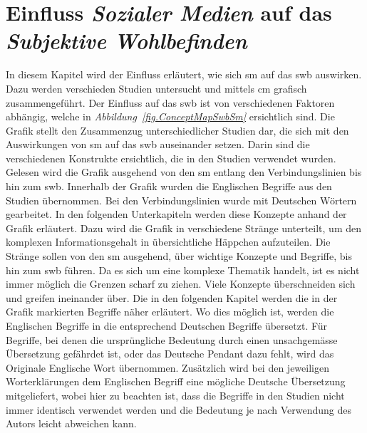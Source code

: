 %
%
\thispagestyle{empty}
\chapter{Einfluss \textit{Sozialer Medien} auf das \textit{Subjektive Wohlbefinden}}\label{chap.einfluss}
In diesem Kapitel wird der Einfluss erläutert, wie sich \gls{sm} auf das \gls{swb} auswirken. Dazu werden verschieden Studien untersucht und mittels \gls{cm} grafisch zusammengeführt. Der Einfluss auf das \gls{swb} ist von verschiedenen Faktoren abhängig, welche in \textit{Abbildung~\ref{fig.ConceptMapSwbSm}} ersichtlich sind.\newline
Die Grafik stellt den Zusammenzug unterschiedlicher Studien dar, die sich mit den Auswirkungen von \gls{sm} auf das \gls{swb} auseinander setzen. Darin sind die verschiedenen Konstrukte ersichtlich, die in den Studien verwendet wurden. Gelesen wird die Grafik ausgehend von den \gls{sm} entlang den Verbindungslinien bis hin zum \gls{swb}.\newline
Innerhalb der Grafik wurden die Englischen Begriffe aus den Studien übernommen. Bei den Verbindungslinien wurde mit Deutschen Wörtern gearbeitet.\newline
In den folgenden Unterkapiteln werden diese Konzepte anhand der Grafik erläutert. Dazu wird die Grafik in verschiedene Stränge unterteilt, um den komplexen Informationsgehalt in übersichtliche Häppchen aufzuteilen. Die Stränge sollen von den \gls{sm} ausgehend, über wichtige Konzepte und Begriffe, bis hin zum \gls{swb} führen. Da es sich um eine komplexe Thematik handelt, ist es nicht immer möglich die Grenzen scharf zu ziehen. Viele Konzepte überschneiden sich und greifen ineinander über.\newline
Die in den folgenden Kapitel werden die in der Grafik markierten Begriffe näher erläutert. Wo dies möglich ist, werden die Englischen Begriffe in die entsprechend Deutschen Begriffe übersetzt. Für Begriffe, bei denen die ursprüngliche Bedeutung durch einen unsachgemässe Übersetzung gefährdet ist, oder das Deutsche Pendant dazu fehlt, wird das Originale Englische Wort übernommen. Zusätzlich wird bei den jeweiligen Worterklärungen dem Englischen Begriff eine mögliche Deutsche Übersetzung mitgeliefert, wobei hier zu beachten ist, dass die Begriffe in den Studien nicht immer identisch verwendet werden und die Bedeutung je nach Verwendung des Autors leicht abweichen kann.\newline 


